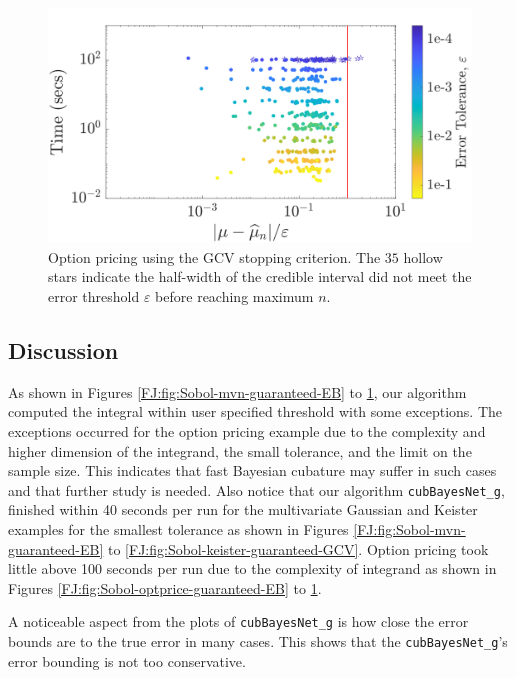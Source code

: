 \documentclass[graybox,footinfo]{svmult}
\newcommand{\FJHNote}[1]{{\textcolor{blue}{FJH: #1}}}
\begin{document}
\begin{figure}
\centering
\includegraphics[width=0.95\linewidth]{"figures/Sobol/Sobol_optPrice_guaranteed_time_GCV__d12_r1_2019-Sep-1"}
\caption[Sobol: Option pricing guaranteed: GCV]{Option pricing using the GCV stopping criterion. The $35$ hollow stars indicate the half-width of the credible interval did not meet the error threshold $\varepsilon$ before reaching maximum $n$. 
}
\label{FJ:fig:Sobol-optprice-guaranteed-GCV}
\end{figure}




\subsection{Discussion}


As shown in Figures \ref{FJ:fig:Sobol-mvn-guaranteed-EB} to \ref{FJ:fig:Sobol-optprice-guaranteed-GCV}, our algorithm computed the integral within user specified threshold with some exceptions. The exceptions occurred for the  option pricing example due to the complexity and higher dimension of the integrand, the small tolerance, and the limit on the sample size.  This indicates that fast Bayesian cubature may suffer in such cases and that further study is needed. 
Also notice that our algorithm \texttt{cubBayesNet\_g}, finished within 40 seconds per run for the multivariate Gaussian and Keister examples  for the smallest tolerance as shown in Figures \ref{FJ:fig:Sobol-mvn-guaranteed-EB} to \ref{FJ:fig:Sobol-keister-guaranteed-GCV}. Option pricing took little above 100 seconds per run due to the complexity of integrand as shown in Figures \ref{FJ:fig:Sobol-optprice-guaranteed-EB} to \ref{FJ:fig:Sobol-optprice-guaranteed-GCV}.

A  noticeable aspect from the plots of \texttt{cubBayesNet\_g} is how close the error bounds are to the true error in many cases. 
This shows that the \texttt{cubBayesNet\_g}'s error bounding is not too conservative.
\end{document}
